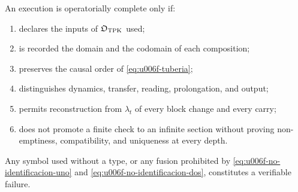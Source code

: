 \begin{criterion}
\label{crit:u006f-completitud}
An execution is operatorially complete only if:
\begin{enumerate}
 \item declares the inputs of \(\mathfrak O_{\rm TPK}\) used;
 \item is recorded the domain and the codomain of each composition;
 \item preserves the causal order of \eqref{eq:u006f-tuberia};
 \item distinguishes dynamics, transfer, reading, prolongation, and output;
 \item permits reconstruction from \(\lambda_t\) of every block change and
 every carry;
 \item does not promote a finite check to an infinite section without
 proving non-emptiness, compatibility, and uniqueness at every depth.
\end{enumerate}
Any symbol used without a type, or any fusion prohibited by
\eqref{eq:u006f-no-identificacion-uno} and
\eqref{eq:u006f-no-identificacion-dos}, constitutes a verifiable failure.
\end{criterion}
